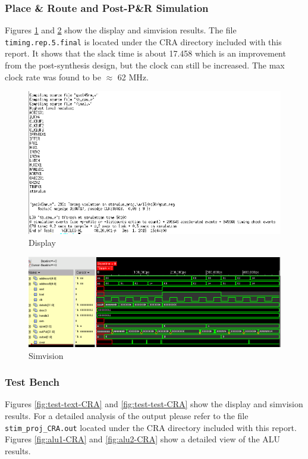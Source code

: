 \documentclass[12pt]{article}
\begin{document}
\subsubsection{Place \& Route and Post-P\&R Simulation}
Figures \ref{fig:encounter-text-CRA} and \ref{fig:encounter-test-CRA} show the display and simvision results. The file \texttt{timing.rep.5.final} is located under the CRA directory included with this report. It shows that the slack time is about 17.458 which is an improvement from the post-synthesis design, but the clock can still be increased. The max clock rate was found to be $\approx$ 62 MHz.
\begin{figure}[H]
\centering
\includegraphics[width=.7\linewidth]{../CRA/encounter-text}
\caption{Display}
\label{fig:encounter-text-CRA}
\end{figure}
\begin{figure}[H]
\centering
\includegraphics[width=1\linewidth]{../CRA/encounter-test}
\caption{Simvision}
\label{fig:encounter-test-CRA}
\end{figure}

\subsubsection{Test Bench}
Figures \ref{fig:test-text-CRA} and \ref{fig:test-test-CRA} show the display and simvision results. For a detailed analysis of the output please refer to the file \texttt{stim\_proj\_CRA.out} located under the CRA directory included with this report. Figures  \ref{fig:alu1-CRA} and \ref{fig:alu2-CRA} show a detailed view of the ALU results.
\end{document}
